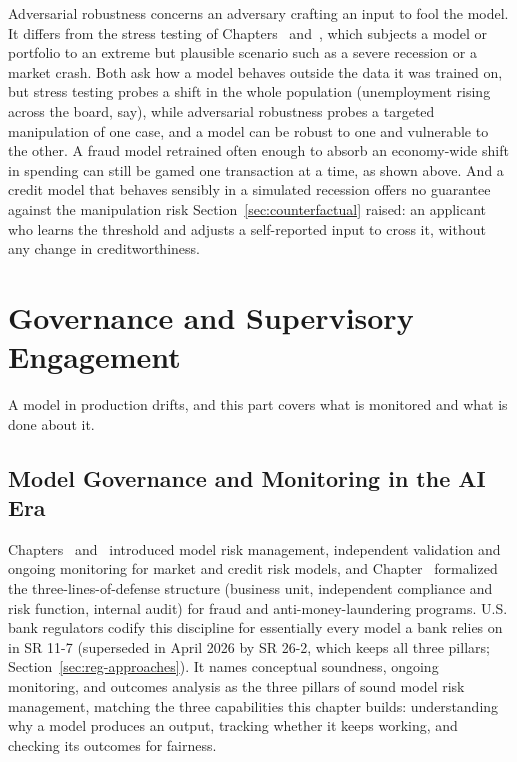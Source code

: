 \documentclass[../ai_in_finance]{subfiles}
\begin{document}
Adversarial robustness concerns an adversary crafting an input to fool the model. It differs from the stress testing of Chapters~ and~, which subjects a model or portfolio to an extreme but plausible scenario such as a severe recession or a market crash. Both ask how a model behaves outside the data it was trained on, but stress testing probes a shift in the whole population (unemployment rising across the board, say), while adversarial robustness probes a targeted manipulation of one case, and a model can be robust to one and vulnerable to the other. A fraud model retrained often enough to absorb an economy-wide shift in spending can still be gamed one transaction at a time, as shown above. And a credit model that behaves sensibly in a simulated recession offers no guarantee against the manipulation risk Section~\ref{sec:counterfactual} raised: an applicant who learns the threshold and adjusts a self-reported input to cross it, without any change in creditworthiness.

\section{Governance and Supervisory Engagement}

A model in production drifts, and this part covers what is monitored and what is done about it.

\subsection{Model Governance and Monitoring in the AI Era}
\label{sec:governance-monitoring}

Chapters~ and~ introduced model risk management, independent validation and ongoing monitoring for market and credit risk models, and Chapter~ formalized the three-lines-of-defense structure (business unit, independent compliance and risk function, internal audit) for fraud and anti-money-laundering programs. U.S. bank regulators codify this discipline for essentially every model a bank relies on in SR 11-7 \parencite{frb2011supervisory} (superseded in April 2026 by SR 26-2, which keeps all three pillars; Section~\ref{sec:reg-approaches}). It names conceptual soundness, ongoing monitoring, and outcomes analysis as the three pillars of sound model risk management, matching the three capabilities this chapter builds: understanding why a model produces an output, tracking whether it keeps working, and checking its outcomes for fairness.
\end{document}
